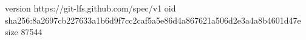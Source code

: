 version https://git-lfs.github.com/spec/v1
oid sha256:8a2697cb227633a1b6d9f7cc2caf5a5e86d4a867621a506d2e3a4a8b4601d47e
size 87544
